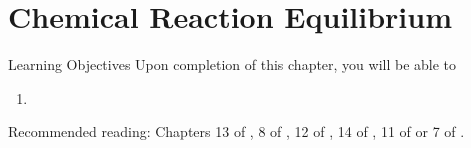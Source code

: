 \chapter{Chemical Reaction Equilibrium}\label{Chapter:ChemicalReactions}

   \begin{LearningObjectivesBlock}{Learning Objectives}
      Upon completion of this chapter, you will be able to
        \begin{enumerate}
           \item 
        \end{enumerate}
\medskip
     Recommended reading: Chapters 13 of \citet{SmithVanNess_Book}, 8 of \cite{Sandler_Book}, 12 of \citet{Lue_Book}, 14 of \citet{Moran_Book}, 11 of \citet{Devoe_Book} or 7 of \citet{Atkins_Book}.
   \end{LearningObjectivesBlock}


\begin{comment}
   \begin{LearningObjectivesBlock}{Learning Objectives}
      Upon completion of this chapter, you will be able to
        \begin{enumerate}
           \item {\bf Knowledge:} Define, Name, Select, State 
           \item {\bf Comprehension:} Describe, Identify, Discuss
           \item {\bf Application:} Apply, Demonstrate, Employ, Sketch
           \item {\bf Analysis:} Analyse, Compare, Calculate, Solve
           \item {\bf Synthesis:} Determine, Formulate
           \item {\bf Evaluation:} Assess, Check, Estimate, Compare, Measure, Monitor
        \end{enumerate}
\end{comment}

\localtableofcontents
   
